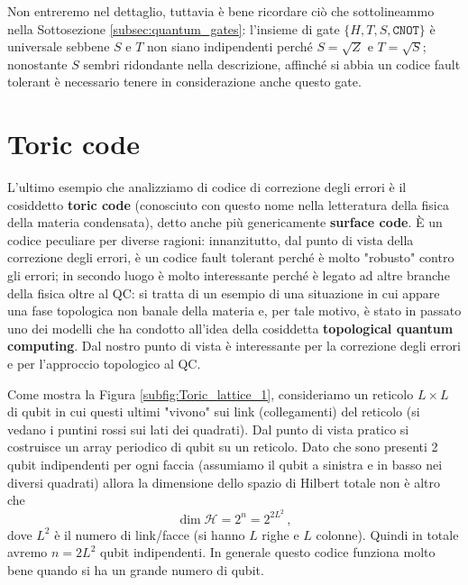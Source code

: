 \noindent Non entreremo nel dettaglio, tuttavia è bene ricordare ciò che sottolineammo nella Sottosezione \ref{subsec:quantum_gates}: l'insieme di gate $\{ H, T, S, \texttt{CNOT} \}$ è universale sebbene $S$ e $T$ non siano indipendenti perché $S= \sqrt{Z}$ e $T = \sqrt{S}$; nonostante $S$ sembri ridondante nella descrizione, affinché si abbia un codice fault tolerant è necessario tenere in considerazione anche questo gate. 

\section{Toric code}
L'ultimo esempio che analizziamo di codice di correzione degli errori è il cosiddetto \textbf{toric code} (conosciuto con questo nome nella letteratura della fisica della materia condensata), detto anche più genericamente \textbf{surface code}. È un codice peculiare per diverse ragioni: innanzitutto, dal punto di vista della correzione degli errori, è un codice fault tolerant perché è molto "robusto" contro gli errori; in secondo luogo è molto interessante perché è legato ad altre branche della fisica oltre al QC: si tratta di un esempio di una situazione in cui appare una fase topologica non banale della materia e, per tale motivo, è stato in passato uno dei modelli che ha condotto all'idea della cosiddetta \textbf{topological quantum computing}. Dal nostro punto di vista è interessante per la correzione degli errori e per l'approccio topologico al QC. 

\noindent Come mostra la Figura \ref{subfig:Toric_lattice_1}, consideriamo un reticolo $L \times L$ di qubit in cui questi ultimi "vivono" sui link (collegamenti) del reticolo (si vedano i puntini rossi sui lati dei quadrati). Dal punto di vista pratico si costruisce un array periodico di qubit su un reticolo. Dato che sono presenti 2 qubit indipendenti per ogni faccia (assumiamo il qubit a sinistra e in basso nei diversi quadrati) allora la dimensione dello spazio di Hilbert totale non è altro che
\begin{equation*}
    \dim \mathcal{H} = 2^n = 2^{2 L^2} \, ,
\end{equation*}
dove $L^2$ è il numero di link/facce (si hanno $L$ righe e $L$ colonne). Quindi in totale avremo $n = 2 L^2$ qubit indipendenti. In generale questo codice funziona molto bene quando si ha un grande numero di qubit.

